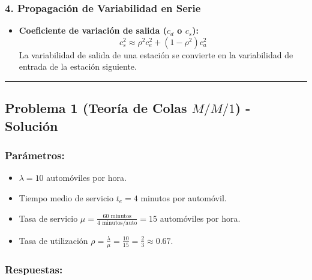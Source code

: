 \documentclass[
]{article}
\providecommand{\tightlist}{%
  \setlength{\itemsep}{0pt}\setlength{\parskip}{0pt}}
\begin{document}
\hypertarget{propagaciuxf3n-de-variabilidad-en-serie}{%
\subsubsection{4. Propagación de Variabilidad en
Serie}\label{propagaciuxf3n-de-variabilidad-en-serie}}

\begin{itemize}
\tightlist
\item
  \textbf{Coeficiente de variación de salida (\(c_d\) o \(c_s\)):}
  \[c_s^2 \approx \rho^2 c_e^2 + (1 - \rho^2) c_a^2\] La variabilidad de
  salida de una estación se convierte en la variabilidad de entrada de
  la estación siguiente.
\end{itemize}

\begin{center}\rule{0.5\linewidth}{0.5pt}\end{center}

\hypertarget{problema-1-teoruxeda-de-colas-mm1---soluciuxf3n}{%
\subsection{\texorpdfstring{Problema 1 (Teoría de Colas \(M/M/1\)) -
Solución}{Problema 1 (Teoría de Colas M/M/1) - Solución}}\label{problema-1-teoruxeda-de-colas-mm1---soluciuxf3n}}

\hypertarget{paruxe1metros}{%
\subsubsection{Parámetros:}\label{paruxe1metros}}

\begin{itemize}
\tightlist
\item
  \(\lambda = 10\) automóviles por hora.
\item
  Tiempo medio de servicio \(t_e = 4\) minutos por automóvil.
\item
  Tasa de servicio
  \(\mu = \frac{60\text{ minutos}}{4\text{ minutos/auto}} = 15\)
  automóviles por hora.
\item
  Tasa de utilización
  \(\rho = \frac{\lambda}{\mu} = \frac{10}{15} = \frac{2}{3} \approx 0.67\).
\end{itemize}

\hypertarget{respuestas}{%
\subsubsection{Respuestas:}\label{respuestas}}
\end{document}
